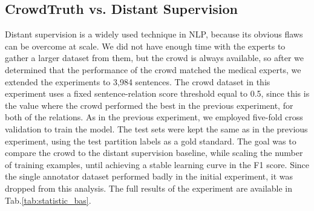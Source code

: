 \subsection{CrowdTruth vs. Distant Supervision}

Distant supervision is a widely used technique in NLP, because its obvious flaws can be overcome at scale.  We did not have enough time with the experts to gather a larger dataset from them, but the crowd is always available, so after we determined that the performance of the crowd matched the medical experts, we extended the experiments to 3,984 sentences. The crowd dataset in this experiment uses a fixed sentence-relation score threshold equal to 0.5, since this is the value where the crowd performed the best in the previous experiment, for both of the relations. As in the previous experiment, we employed five-fold cross validation to train the model. The test sets were kept the same as in the previous experiment, using the test partition labels as a gold standard. The goal was to compare the crowd to the distant supervision baseline, while scaling the number of training examples, until achieving a stable learning curve in the F1 score. Since the single annotator dataset performed badly in the initial experiment, it was dropped from this analysis. The full results of the experiment are available in Tab.\ref{tab:statistic_bas}.

